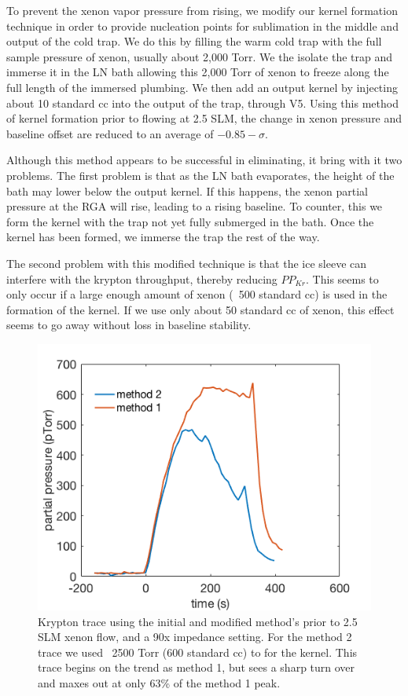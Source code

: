 To prevent the xenon vapor pressure from rising, we modify our kernel formation technique in order to provide nucleation points for sublimation in the middle and output of the cold trap. We do this by filling the warm cold trap with the full sample pressure of xenon, usually about 2,000 Torr. We the isolate the trap and immerse it in the LN bath allowing this 2,000 Torr of xenon to freeze along the full length of the immersed plumbing. We then add an output kernel by injecting about 10 standard cc into the output of the trap, through V5. Using this method of kernel formation prior to flowing at 2.5 SLM, the change in xenon pressure and baseline offset are reduced to an average of $-0.85-\sigma$. 

Although this method appears to be successful in eliminating, it bring with it two problems. The first problem is that as the LN bath evaporates, the height of the bath may lower below the output kernel. If this happens, the xenon partial pressure at the RGA will rise, leading to a rising baseline. To counter, this we form the kernel with the trap not yet fully submerged in the bath. Once the kernel has been formed, we immerse the trap the rest of the way.

The second problem with this modified technique is that the ice sleeve can interfere with the krypton throughput, thereby reducing $PP_{Kr}$. This seems to only occur if a large enough amount of xenon (~500 standard cc) is used in the formation of the kernel. If we use only about 50 standard cc of xenon, this effect seems to go away without loss in baseline stability. 
\begin{figure}[h!]
\centering
\includegraphics[width=\textwidth]{Figures/ice_form_Krloss.png}
\caption{Krypton trace using the initial and modified method's prior to 2.5 SLM xenon flow, and a 90x impedance setting. For the method 2 trace we used ~2500 Torr (600 standard cc) to for the kernel. This trace begins on the trend as method 1, but sees a sharp turn over and maxes out at only 63\% of the method 1 peak. } 
\label{fig:iceformkrloss}
\end{figure} 


